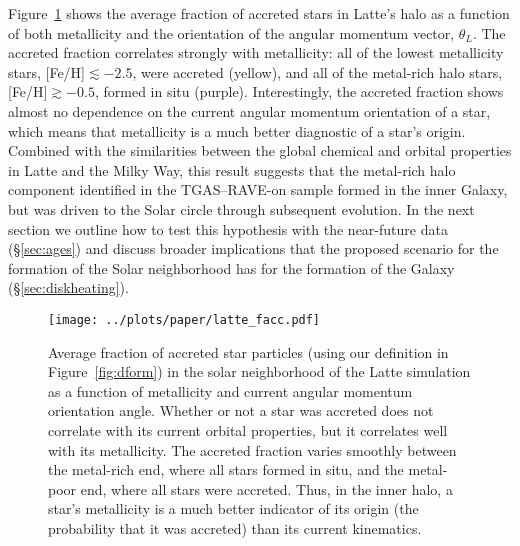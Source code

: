 \documentclass[apj, twocolappendix, numberedappendix, appendixfloats]{emulateapj}
\begin{document}
Figure~\ref{fig:facc} shows the average fraction of accreted stars in Latte's halo as a function of both metallicity and the orientation of the angular momentum vector, $\theta_L$.
The accreted fraction correlates strongly with metallicity: all of the lowest metallicity stars, [Fe/H]$\lesssim-2.5$, were accreted (yellow), and all of the metal-rich halo stars, [Fe/H]$\gtrsim-0.5$, formed in situ (purple).
Interestingly, the accreted fraction shows almost no dependence on the current angular momentum orientation of a star, which means that metallicity is a much better diagnostic of a star's origin.
Combined with the similarities between the global chemical and orbital properties in Latte and the Milky Way, this result suggests that the metal-rich halo component identified in the TGAS--RAVE-on sample formed in the inner Galaxy, but was driven to the Solar circle through subsequent evolution.
In the next section we outline how to test this hypothesis with the near-future data (\S\ref{sec:ages}) and discuss broader implications that the proposed scenario for the formation of the Solar neighborhood has for the formation of the Galaxy (\S\ref{sec:diskheating}).


\begin{figure}
\begin{center}
\texttt{[image: ../plots/paper/latte\_facc.pdf]}
\caption{Average fraction of accreted star particles (using our definition in Figure~\ref{fig:dform}) in the solar neighborhood of the Latte simulation as a function of metallicity and current angular momentum orientation angle.
Whether or not a star was accreted does not correlate with its current orbital properties, but it correlates well with its metallicity.
The accreted fraction varies smoothly between the metal-rich end, where all stars formed in situ, and the metal-poor end, where all stars were accreted.
Thus, in the inner halo, a star's metallicity is a much better indicator of its origin (the probability that it was accreted) than its current kinematics.
}
\label{fig:facc}
\end{center}
\end{figure}
\end{document}
